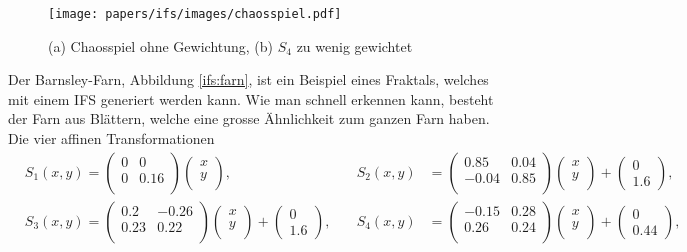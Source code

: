 \begin{figure}	
	\centering
	\texttt{[image: papers/ifs/images/chaosspiel.pdf]}
	\caption{(a) Chaosspiel ohne Gewichtung, (b) $S_4$ zu wenig gewichtet}
	\label{ifs:farnweight}
\end{figure}%
Der Barnsley-Farn, Abbildung \ref{ifs:farn}, ist ein Beispiel eines Fraktals, welches mit einem IFS generiert werden kann.
%
Wie man schnell erkennen kann, besteht der Farn aus Blättern, welche eine grosse Ähnlichkeit zum ganzen Farn haben.
Die vier affinen Transformationen
\begin{align}
	& {S_1(x,y)}
	= 
	\begin{pmatrix}
		0 & 0 \\
		0 & 0.16 \\
	\end{pmatrix}
	\begin{pmatrix}
		x\\
		y\\
	\end{pmatrix}, \quad &
	{S_2(x,y)}
	&= 
	\begin{pmatrix}
		0.85 & 0.04 \\
		-0.04 & 0.85 \\
	\end{pmatrix}
	\begin{pmatrix}
		x\\
		y\\
	\end{pmatrix} 
	+
	\begin{pmatrix}
		0 \\
		1.6
	\end{pmatrix},\\
	& {S_3(x,y)}
	= 
	\begin{pmatrix}
		0.2 & -0.26 \\
		0.23 & 0.22 \\
	\end{pmatrix}
	\begin{pmatrix}
		x\\
		y\\
	\end{pmatrix} 
	+
	\begin{pmatrix}
		0 \\
		1.6
	\end{pmatrix}, \quad &
	{S_4(x,y)}
	&= 
	\begin{pmatrix}
		-0.15 & 0.28 \\
		0.26 & 0.24 \\
	\end{pmatrix}
	\begin{pmatrix}
		x\\
		y\\
	\end{pmatrix} 
	+
	\begin{pmatrix}
		0 \\
		0.44
	\end{pmatrix},
	\label{ifs:farnFormel}
\end{align}

